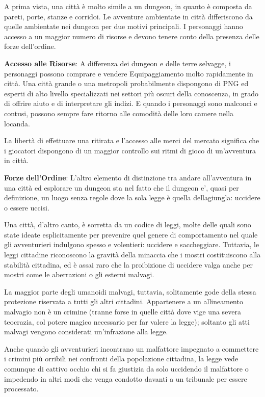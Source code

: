 \documentclass[a4paper,11pt,twoside,openany]{book}
\begin{document}
A prima vista, una città è molto simile a un dungeon, in quanto è composta da pareti, porte, stanze e corridoi. Le avventure ambientate in città differiscono da quelle ambientate nei dungeon per due motivi principali. I personaggi hanno accesso a un maggior numero di risorse e devono tenere conto della presenza delle forze dell'ordine.

\textbf{Accesso alle Risorse}: A differenza dei dungeon e delle terre selvagge, i personaggi possono comprare e vendere Equipaggiamento molto rapidamente in città. Una città grande o una metropoli probabilmente dispongono di PNG ed esperti di alto livello specializzati nei settori più oscuri della conoscenza, in grado di offrire aiuto e di interpretare gli indizi. E quando i personaggi sono malconci e contusi, possono sempre fare ritorno alle comodità delle loro camere nella locanda.

La libertà di effettuare una ritirata e l'accesso alle merci del mercato significa che i giocatori dispongono di un maggior controllo sui ritmi di gioco di un'avventura in città.

\textbf{Forze dell'Ordine}: L'altro elemento di distinzione tra andare all'avventura in una città ed esplorare un dungeon sta nel fatto che il dungeon e', quasi per definizione, un luogo senza regole dove la sola legge è quella dellagiungla: uccidere o essere uccisi.

Una città, d'altro canto, è sorretta da un codice di leggi, molte delle quali sono state ideate esplicitamente per prevenire quel genere di comportamento nel quale gli avventurieri indulgono spesso e volentieri: uccidere e saccheggiare. Tuttavia, le leggi cittadine riconoscono la gravità della minaccia che i mostri costituiscono alla stabilità cittadina, ed è assai raro che la proibizione di uccidere valga anche per mostri come le aberrazioni o gli esterni malvagi.

La maggior parte degli umanoidi malvagi, tuttavia, solitamente gode della stessa protezione riservata a tutti gli altri cittadini. Appartenere a un allineamento malvagio non è un crimine (tranne forse in quelle città dove vige una severa teocrazia, col potere magico necessario per far valere la legge); soltanto gli atti malvagi vengono considerati un'infrazione alla legge.

Anche quando gli avventurieri incontrano un malfattore impegnato a commettere i crimini più orribili nei confronti della popolazione cittadina, la legge vede comunque di cattivo occhio chi si fa giustizia da solo uccidendo il malfattore o impedendo in altri modi che venga condotto davanti a un tribunale per essere processato.
\end{document}
